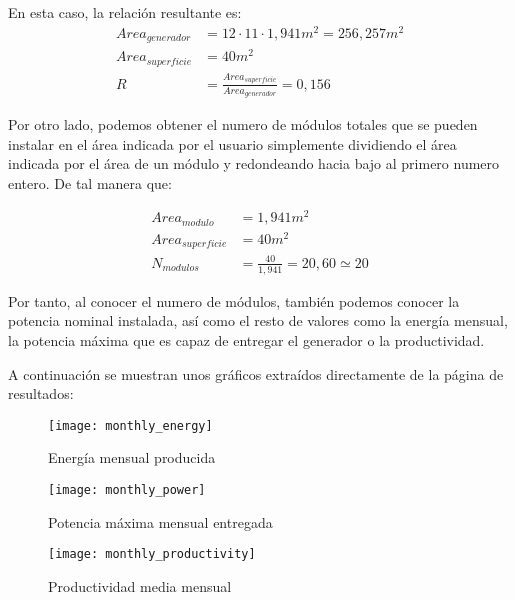 En esta caso, la relación resultante es: 
\begin{equation}
\begin{align*}
Area_{generador} &= 12 \cdot 11 \cdot 1,941 m^2 = 256,257 m^2 \\
Area_{superficie} &= 40 m^2 \\
R &= \frac{Area_{superficie}}{Area_{generador}} = 0,156
\end{align*}
\end{equation}

Por otro lado, podemos obtener el numero de módulos totales que se pueden instalar en el área indicada por el usuario simplemente dividiendo el área indicada por el área de un módulo y redondeando hacia bajo al primero numero entero. De tal manera que:

\begin{equation}
\begin{align*}
Area_{modulo} &=  1,941 m^2 \\
Area_{superficie} &= 40 m^2 \\
N_{modulos} &= \frac{40}{1,941} = 20,60 \simeq 20
\end{align*}
\end{equation}

Por tanto, al conocer el numero de módulos, también podemos conocer la potencia nominal instalada, así como el resto de valores como la energía mensual, la potencia máxima que es capaz de entregar el generador o la productividad.

A continuación se muestran unos gráficos extraídos directamente de la página de resultados:

\begin{figure}[htbp]
\texttt{[image: monthly\_energy]}
\centering
\caption{Energía mensual producida}
\label{fig:fig_energy}
\end{figure}

\begin{figure}[htbp]
\texttt{[image: monthly\_power]}
\centering
\caption{Potencia máxima mensual entregada}
\label{fig:fig_power}
\end{figure}

\begin{figure}[htbp]
\texttt{[image: monthly\_productivity]}
\centering
\caption{Productividad media mensual}
\label{fig:fig_prod}
\end{figure}
